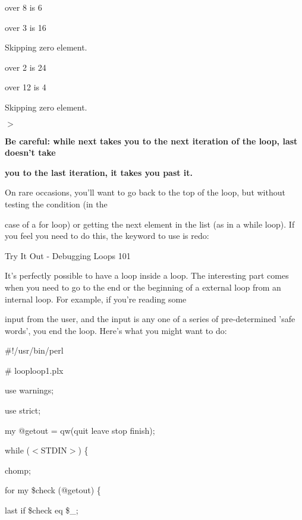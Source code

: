 \documentclass[a4paper,11pt]{book}
\begin{document}
 over 8 is 6

 over 3 is 16

\noindent Skipping zero element.

 over 2 is 24

 over 12 is 4

\noindent Skipping zero element.

\noindent $>$

\noindent 

\noindent 

\noindent \textbf{Be careful: while next takes you to the next iteration of the loop, last doesn't take}

\noindent \textbf{you to the last iteration, it takes you past it.}

\noindent 

\noindent 

\noindent On rare occasions, you'll want to go back to the top of the loop, but without testing the condition (in the

\noindent case of a for loop) or getting the next element in the list (as in a while loop). If you feel you need to do this, the keyword to use is redo:

\noindent 

\noindent Try It Out - Debugging Loops 101

\noindent It's perfectly possible to have a loop inside a loop. The interesting part comes when you need to go to the end or the beginning of a external loop from an internal loop. For example, if you're reading some

\noindent input from the user, and the input is any one of a series of pre-determined 'safe words', you end the loop. Here's what you might want to do:

\noindent 

\noindent \#!/usr/bin/perl

\noindent \# looploop1.plx

\noindent use warnings;

\noindent use strict;

\noindent my @getout = qw(quit leave stop finish);

\noindent 

\noindent 

\noindent while ($<$STDIN$>$) \{

\noindent chomp;

\noindent for my \$check (@getout) \{

\noindent last if \$check eq \$\_;
\end{document}
